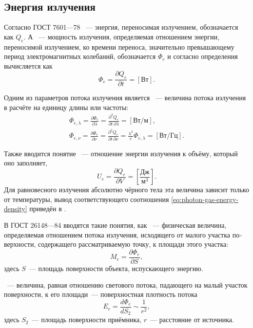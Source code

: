 \subsection{Энергия излучения}
Согласно ГОСТ 7601---78 ~--- энергия, переносимая излучением, обозначается как $Q_e$. А ~--- мощность излучения, определяемая отношением энергии, переносимой излучением, ко времени переноса,  значительно превышающему период электромагнитных колебаний, обозначается $\Phi_e$ и согласно определения вычисляется как
\begin{equation}
    \Phi_e = \frac{\partial Q_e}{\partial t} = [\text{Вт}].
\end{equation}

Одним из параметров потока излучения является ~--- величина потока излучения в расчёте на единицу длины или частоты:
\begin{gather*}
    \Phi_{e, \lambda}
    = \frac{\partial \Phi_e}{\partial \lambda} 
    = \frac{\partial^2 Q_e}{\partial t \, \partial \lambda}
    = [\text{Вт/м}],\\
    \Phi_{e, \nu} 
    = \frac{\partial \Phi_e}{\partial \nu} 
    = \frac{\partial^2 Q_e}{\partial t \, \partial \nu}
    = \frac{\lambda^2}{c}\Phi_{e, \lambda}
    = [\text{Вт/Гц}].
\end{gather*}

Также вводится понятие ~--- отношение энергии излучения к объёму, который оно заполняет,
\begin{equation}
    U_e = \frac{\partial Q_e}{\partial V} = \left[\frac{\text{Дж}}{\text{м}^3}\right].
\end{equation}
Для равновесного излучения абсолютно чёрного тела эта величина зависит только от температуры, вывод соответствующего соотношения \eqref{eq:photon-gas-energy-density} приведён в .

В ГОСТ 26148---84 вводятся такие понятия, как ~--- физическая величина, определяемая отношением потока излучения, исходящего от малого участка по­верхности, содержащего рассматри­ваемую точку, к площади этого участка:
\begin{equation}
    M_e = \frac{\partial \Phi_e}{\partial S},
\end{equation}
здесь $S$~--- площадь поверхности объекта, испускающего энергию.

~--- величина, равная отношению светового потока, падающего на малый участок поверхности, к его площади~--- поверхностная плотность потока
\begin{equation}
    E_e = \frac{d\Phi_e}{dS_2} \sim \frac{1}{r^2},
\end{equation}
здесь $S_2$~--- площадь поверхности приёмника, $r$~--- расстояние от источника.

